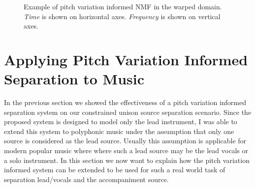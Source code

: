 \begin{figure}[H]
    \hfill

    \hfill
    \caption{Example of pitch variation informed NMF in the warped domain. \textit{Time} is shown on horizontal axes. \textit{Frequency} is shown on vertical axes.}
    \label{fig:warpingdemo}
\end{figure}

\section{Applying Pitch Variation Informed Separation to Music}

In the previous section we showed the effectiveness of a pitch variation informed separation system on our constrained unison source separation scenario.
Since the proposed system is designed to model only the lead instrument, I was able to extend this system to polyphonic music under the assumption that only one source is considered as the lead source.
Usually this assumption is applicable for modern popular music where where such a lead source may be the lead vocals or a solo instrument.
In this section we now want to explain how the pitch variation informed system can be extended to be used for such a real world task of separation lead/vocals and the accompaniment source.

